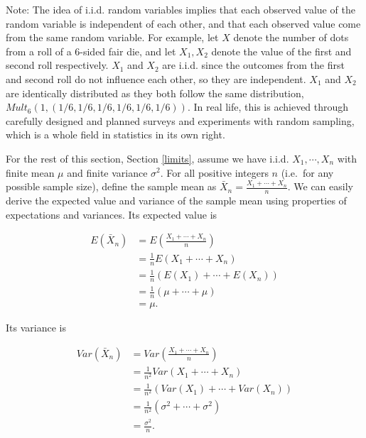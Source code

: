 \documentclass[
]{book}
\begin{document}
Note: The idea of i.i.d. random variables implies that each observed value of the random variable is independent of each other, and that each observed value come from the same random variable. For example, let \(X\) denote the number of dots from a roll of a 6-sided fair die, and let \(X_1, X_2\) denote the value of the first and second roll respectively. \(X_1\) and \(X_2\) are i.i.d. since the outcomes from the first and second roll do not influence each other, so they are independent. \(X_1\) and \(X_2\) are identically distributed as they both follow the same distribution, \(Mult_6(1, (1/6, 1/6, 1/6, 1/6, 1/6, 1/6))\). In real life, this is achieved through carefully designed and planned surveys and experiments with random sampling, which is a whole field in statistics in its own right.

For the rest of this section, Section \ref{limits}, assume we have i.i.d. \(X_1, \cdots, X_n\) with finite mean \(\mu\) and finite variance \(\sigma^2\). For all positive integers \(n\) (i.e.~for any possible sample size), define the sample mean as \(\bar{X}_n = \frac{X_1 + \cdots + X_n}{n}\). We can easily derive the expected value and variance of the sample mean using properties of expectations and variances. Its expected value is

\begin{equation} 
\begin{split}
E(\bar{X}_n) &= E(\frac{X_1 + \cdots + X_n}{n}) \\
             &= \frac{1}{n}E(X_1 + \cdots + X_n) \\
             &= \frac{1}{n} (E(X_1) + \cdots + E(X_n)) \\
             &= \frac{1}{n} (\mu + \cdots + \mu) \\
             &= \mu.
\end{split}
\label{eq:6-Emean}
\end{equation}

Its variance is

\begin{equation} 
\begin{split}
Var(\bar{X}_n) &= Var(\frac{X_1 + \cdots + X_n}{n}) \\
             &= \frac{1}{n^2}Var(X_1 + \cdots + X_n) \\
             &= \frac{1}{n^2} (Var(X_1) + \cdots + Var(X_n)) \\
             &= \frac{1}{n^2} (\sigma^2 + \cdots + \sigma^2) \\
             &= \frac{\sigma^2}{n}.
\end{split}
\label{eq:6-Varmean}
\end{equation}
\end{document}
